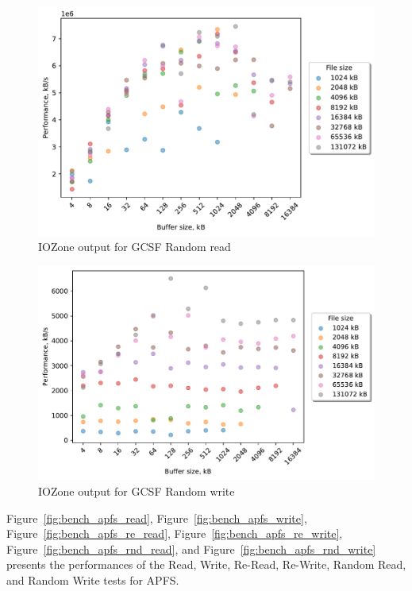 \begin{figure}[!htb]
	\label{fig:bench_gcsf_rnd_read}
	\begin{center}
		\includegraphics[width=1.0\textwidth]{figures/benchmarking/gcsf/Random read.pdf}
	\end{center}
	\caption{IOZone output for GCSF Random read}
\end{figure}

\begin{figure}[!htb]
	\label{fig:bench_gcsf_rnd_write}
	\begin{center}
		\includegraphics[width=1.0\textwidth]{figures/benchmarking/gcsf/Random write.pdf}
	\end{center}
	\caption{IOZone output for GCSF Random write}
\end{figure}

\FloatBarrier

Figure~\ref{fig:bench_apfs_read}, Figure~\ref{fig:bench_apfs_write}, Figure~\ref{fig:bench_apfs_re_read}, Figure~\ref{fig:bench_apfs_re_write}, Figure~\ref{fig:bench_apfs_rnd_read}, and Figure~\ref{fig:bench_apfs_rnd_write} presents the performances of the Read, Write, \mbox{Re-Read}, \mbox{Re-Write}, Random Read, and Random Write tests for \gls{APFS}.

